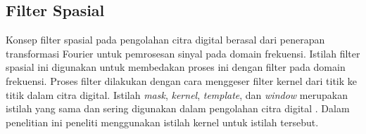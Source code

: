 


\subsection{Filter Spasial}
Konsep filter spasial pada pengolahan citra digital berasal dari penerapan transformasi Fourier untuk pemrosesan sinyal pada domain frekuensi. Istilah filter spasial ini digunakan untuk membedakan proses ini dengan filter pada domain frekuensi. Proses filter dilakukan dengan cara menggeser filter kernel dari titik ke titik dalam citra digital. Istilah \textit{mask}, \textit{kernel}, \textit{template}, dan \textit{window} merupakan istilah yang sama dan sering digunakan dalam pengolahan citra digital \cite{book:gonzalez}. Dalam penelitian ini peneliti menggunakan istilah kernel untuk istilah tersebut.




